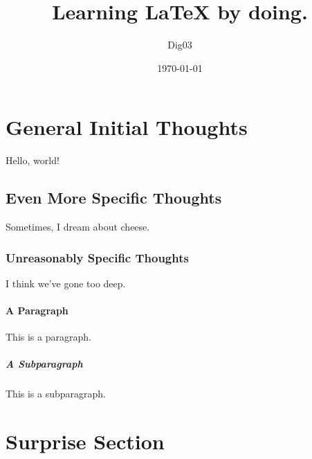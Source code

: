 \documentclass{article}
\title{Learning \LaTeX{} by doing.}
\date{\today}
\author{Dig03}
\begin{document}
\maketitle %
\newpage   %

\section{General Initial Thoughts}

Hello, world!

\subsection{Even More Specific Thoughts}

Sometimes, I dream about cheese.

\subsubsection{Unreasonably Specific Thoughts}

I think we've gone too deep.

\paragraph{A Paragraph}

This is a paragraph.

\subparagraph{A Subparagraph}

This is a subparagraph.

\section{Surprise Section}
\end{document}
